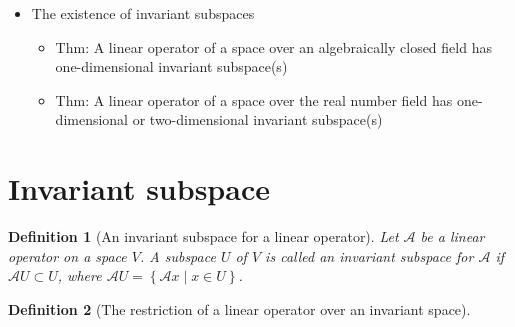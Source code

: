 \documentclass[onecolumn]{ctexart}
\newtheorem{definition}{Definition}
\begin{document}
\begin{itemize}
\begin{itemize}
    \item Thm: A sufficient condition for a linear operator to be diagonalizable in terms of 单谱点
    \item Thm: A necessary and sufficient condition for a linear operator to be diagonalizable in terms of 谱点
  \end{itemize}
  \item The existence of invariant subspaces
  \begin{itemize}
    \item Thm: A linear operator of a space over an algebraically closed field has one-dimensional invariant subspace(s)
    \item Thm: A linear operator of a space over the real number field has one-dimensional or two-dimensional invariant subspace(s)
  \end{itemize}
\end{itemize}

\section{Invariant subspace}
\begin{definition}[An invariant subspace for a linear operator]
  Let $\mathcal{A}$ be a linear operator on a space $V$. A subspace $U$ of $V$ 
  is called an invariant subspace for $\mathcal{A}$ if $\mathcal{A}U \subset U$, 
  where $\mathcal{A}U = \left\{ \mathcal{A}x \mid x \in U \right\}$.
\end{definition}

\begin{definition}[The restriction of a linear operator over an invariant space]
  
\end{definition}
\end{document}
